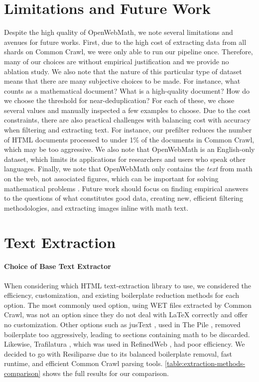 \section{Limitations and Future Work}

Despite the high quality of OpenWebMath, we note several limitations and avenues for future works. First, due to the high cost of extracting data from all shards on Common Crawl, we were only able to run our pipeline once. Therefore, many of our choices are without empirical justification and we provide no ablation study. We also note that the nature of this particular type of dataset means that there are many subjective choices to be made. For instance, what counts as a mathematical document? What is a high-quality document? How do we choose the threshold for near-deduplication? For each of these, we chose several values and manually inspected a few examples to choose. Due to the cost constraints, there are also practical challenges with balancing cost with accuracy when filtering and extracting text. For instance, our prefilter reduces the number of HTML documents processed to under 1\% of the documents in Common Crawl, which may be too aggressive. We also note that OpenWebMath is an English-only dataset, which limits its applications for researchers and users who speak other languages. Finally, we note that OpenWebMath only contains the \textit{text} from math on the web, not associated figures, which can be important for solving mathematical problems \citep{openai2023gpt4}. Future work should focus on finding empirical answers to the questions of what constitutes good data, creating new, efficient filtering methodologies, and extracting images inline with math text.

\section{Text Extraction}
\label{appendix:text_extraction}



\paragraph{Choice of Base Text Extractor} When considering which HTML text-extraction library to use, we considered the efficiency, customization, and existing boilerplate reduction methods for each option. The most commonly used option, using WET files extracted by Common Crawl, was not an option since they do not deal with \LaTeX{} correctly and offer no customization. Other options such as jusText \citep{justext}, used in The Pile \cite{gao2020pile}, removed boilerplate too aggressively, leading to sections containing math to be discarded. Likewise, Trafilatura \citep{barbaresi-2021-trafilatura}, which was used in RefinedWeb \citep{refined-web}, had poor efficiency. We decided to go with Resiliparse \citep{bevendorff:2018} due to its balanced boilerplate removal, fast runtime, and efficient Common Crawl parsing tools. \autoref{table:extraction-methods-comparison} shows the full results for our comparison.

